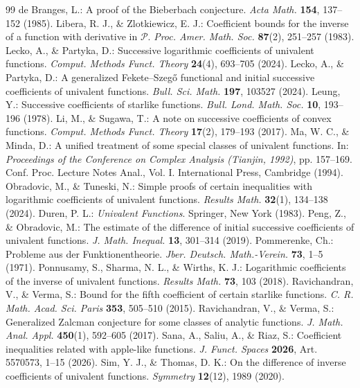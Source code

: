 \documentclass[10pt,a4paper]{amsart}
\numberwithin{equation}{section}
\begin{document}
\begin{thebibliography}{99}
 de Branges, L.: A proof of the Bieberbach conjecture. \emph{Acta Math.} \textbf{154}, 137--152 (1985).
 Libera, R. J., \& Zlotkiewicz, E. J.: Coefficient bounds for the inverse of a function with derivative in $\mathcal{P}$. \emph{Proc. Amer. Math. Soc.} \textbf{87}(2), 251--257 (1983).
 Lecko, A., \& Partyka, D.: Successive logarithmic coefficients of univalent functions. \emph{Comput. Methods Funct. Theory} \textbf{24}(4), 693--705 (2024).
 Lecko, A., \& Partyka, D.: A generalized Fekete--Szeg\H{o} functional and initial successive coefficients of univalent functions. \emph{Bull. Sci. Math.} \textbf{197}, 103527 (2024).
 Leung, Y.: Successive coefficients of starlike functions. \emph{Bull. Lond. Math. Soc.} \textbf{10}, 193--196 (1978).
 Li, M., \& Sugawa, T.: A note on successive coefficients of convex functions. \emph{Comput. Methods Funct. Theory} \textbf{17}(2), 179--193 (2017).
 Ma, W. C., \& Minda, D.: A unified treatment of some special classes of univalent functions. In: \emph{Proceedings of the Conference on Complex Analysis (Tianjin, 1992)}, pp. 157--169. Conf. Proc. Lecture Notes Anal., Vol. I. International Press, Cambridge (1994).
 Obradovic, M., \& Tuneski, N.: Simple proofs of certain inequalities with logarithmic coefficients of univalent functions. \emph{Results Math.} \textbf{32}(1), 134--138 (2024).
 Duren, P. L.: \emph{Univalent Functions}. Springer, New York (1983).
 Peng, Z., \& Obradovic, M.: The estimate of the difference of initial successive coefficients of univalent functions. \emph{J. Math. Inequal.} \textbf{13}, 301--314 (2019).
 Pommerenke, Ch.: Probleme aus der Funktionentheorie. \emph{Jber. Deutsch. Math.-Verein.} \textbf{73}, 1--5 (1971).
 Ponnusamy, S., Sharma, N. L., \& Wirths, K. J.: Logarithmic coefficients of the inverse of univalent functions. \emph{Results Math.} \textbf{73}, 103 (2018).
 Ravichandran, V., \& Verma, S.: Bound for the fifth coefficient of certain starlike functions. \emph{C. R. Math. Acad. Sci. Paris} \textbf{353}, 505--510 (2015).
 Ravichandran, V., \& Verma, S.: Generalized Zalcman conjecture for some classes of analytic functions. \emph{J. Math. Anal. Appl.} \textbf{450}(1), 592--605 (2017).
 Sana, A., Saliu, A., \& Riaz, S.: Coefficient inequalities related with apple-like functions. \emph{J. Funct. Spaces} \textbf{2026}, Art. 5570573, 1--15 (2026).
 Sim, Y. J., \& Thomas, D. K.: On the difference of inverse coefficients of univalent functions. \emph{Symmetry} \textbf{12}(12), 1989 (2020).
\end{thebibliography}
\end{document}
